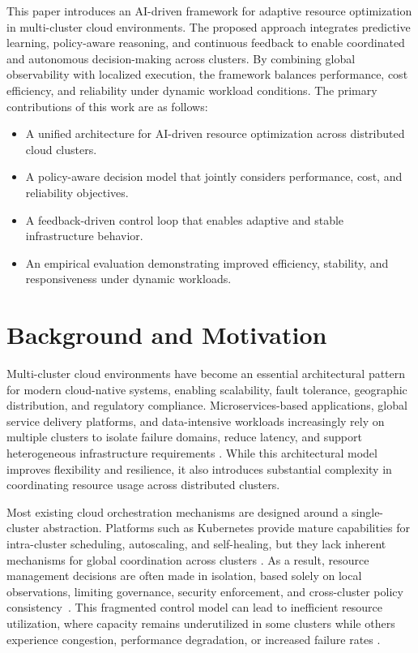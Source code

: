 \documentclass[conference]{IEEEtran}
\begin{document}
This paper introduces an AI-driven framework for adaptive resource optimization in multi-cluster cloud environments. The proposed approach integrates predictive learning, policy-aware reasoning, and continuous feedback to enable coordinated and autonomous decision-making across clusters. By combining global observability with localized execution, the framework balances performance, cost efficiency, and reliability under dynamic workload conditions. The primary contributions of this work are as follows:

\begin{itemize}
    \item A unified architecture for AI-driven resource optimization across distributed cloud clusters.
    \item A policy-aware decision model that jointly considers performance, cost, and reliability objectives.
    \item A feedback-driven control loop that enables adaptive and stable infrastructure behavior.
    \item An empirical evaluation demonstrating improved efficiency, stability, and responsiveness under dynamic workloads.
\end{itemize}

\section{Background and Motivation}

Multi-cluster cloud environments have become an essential architectural pattern for modern cloud-native systems, enabling scalability, fault tolerance, geographic distribution, and regulatory compliance. Microservices-based applications, global service delivery platforms, and data-intensive workloads increasingly rely on multiple clusters to isolate failure domains, reduce latency, and support heterogeneous infrastructure requirements \cite{micro, clarity, aswath2014human}. While this architectural model improves flexibility and resilience, it also introduces substantial complexity in coordinating resource usage across distributed clusters.

Most existing cloud orchestration mechanisms are designed around a single-cluster abstraction. Platforms such as Kubernetes provide mature capabilities for intra-cluster scheduling, autoscaling, and self-healing, but they lack inherent mechanisms for global coordination across clusters \cite{lopezvilos2023clustering}. As a result, resource management decisions are often made in isolation, based solely on local observations, limiting governance, security enforcement, and cross-cluster policy consistency~\cite{vinoth_ijirt}.
 This fragmented control model can lead to inefficient resource utilization, where capacity remains underutilized in some clusters while others experience congestion, performance degradation, or increased failure rates \cite{nachisecurity}.
\end{document}
